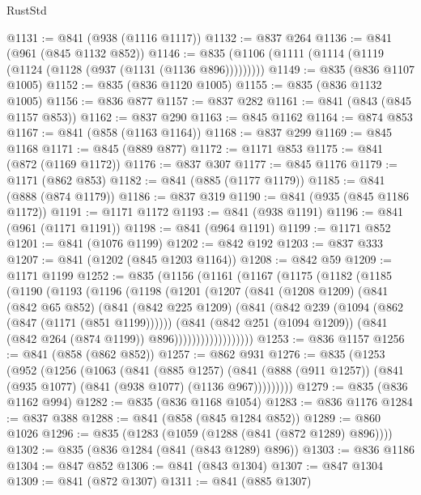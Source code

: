 \begin{lexlean}{RustStd}
\begin{coremodule}
@1131 := @841 (@938 (@1116 @1117))
@1132 := @837 @264
@1136 := @841 (@961 (@845 @1132 @852))
@1146 := @835 (@1106 (@1111 (@1114 (@1119 (@1124 (@1128 (@937 (@1131 (@1136 @896)))))))))
@1149 := @835 (@836 @1107 @1005)
@1152 := @835 (@836 @1120 @1005)
@1155 := @835 (@836 @1132 @1005)
@1156 := @836 @877
@1157 := @837 @282
@1161 := @841 (@843 (@845 @1157 @853))
@1162 := @837 @290
@1163 := @845 @1162
@1164 := @874 @853
@1167 := @841 (@858 (@1163 @1164))
@1168 := @837 @299
@1169 := @845 @1168
@1171 := @845 (@889 @877)
@1172 := @1171 @853
@1175 := @841 (@872 (@1169 @1172))
@1176 := @837 @307
@1177 := @845 @1176
@1179 := @1171 (@862 @853)
@1182 := @841 (@885 (@1177 @1179))
@1185 := @841 (@888 (@874 @1179))
@1186 := @837 @319
@1190 := @841 (@935 (@845 @1186 @1172))
@1191 := @1171 @1172
@1193 := @841 (@938 @1191)
@1196 := @841 (@961 (@1171 @1191))
@1198 := @841 (@964 @1191)
@1199 := @1171 @852
@1201 := @841 (@1076 @1199)
@1202 := @842 @192
@1203 := @837 @333
@1207 := @841 (@1202 (@845 @1203 @1164))
@1208 := @842 @59
@1209 := @1171 @1199
@1252 := @835
    (@1156
      (@1161
        (@1167
          (@1175
            (@1182
              (@1185
                (@1190
                  (@1193
                    (@1196
                      (@1198
                        (@1201
                          (@1207
                            (@841
                              (@1208 @1209)
                              (@841
                                (@842 @65 @852)
                                (@841
                                  (@842 @225 @1209)
                                  (@841
                                    (@842 @239 (@1094 (@862 (@847 (@1171 (@851 @1199))))))
                                    (@841
                                      (@842 @251 (@1094 @1209))
                                      (@841 (@842 @264 (@874 @1199)) @896))))))))))))))))))
@1253 := @836 @1157
@1256 := @841 (@858 (@862 @852))
@1257 := @862 @931
@1276 := @835
    (@1253
      (@952
        (@1256
          (@1063
            (@841
              (@885 @1257)
              (@841 (@888 (@911 @1257)) (@841 (@935 @1077) (@841 (@938 @1077) (@1136 @967)))))))))
@1279 := @835 (@836 @1162 @994)
@1282 := @835 (@836 @1168 @1054)
@1283 := @836 @1176
@1284 := @837 @388
@1288 := @841 (@858 (@845 @1284 @852))
@1289 := @860 @1026
@1296 := @835 (@1283 (@1059 (@1288 (@841 (@872 @1289) @896))))
@1302 := @835 (@836 @1284 (@841 (@843 @1289) @896))
@1303 := @836 @1186
@1304 := @847 @852
@1306 := @841 (@843 @1304)
@1307 := @847 @1304
@1309 := @841 (@872 @1307)
@1311 := @841 (@885 @1307)

\end{coremodule}
\end{lexlean}
